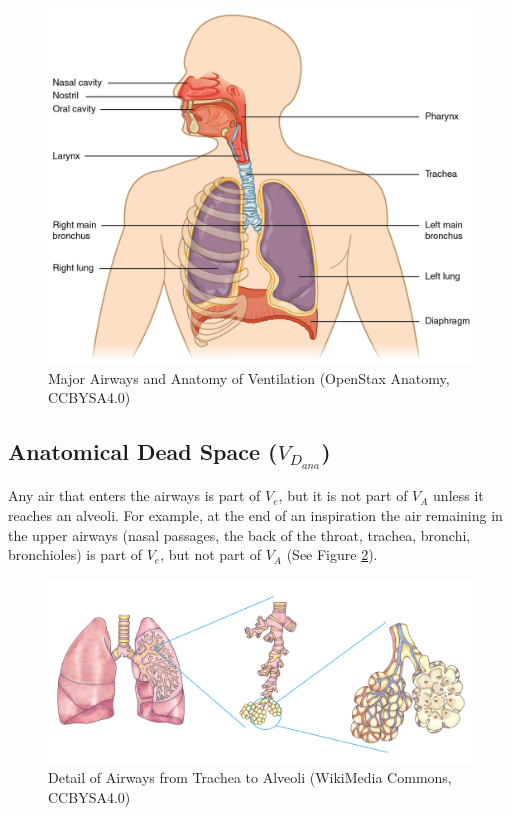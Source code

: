 \begin{figure}[!h]
    \centering
    \includegraphics[width=1.0 \linewidth]{./figure/ventilation/airways.jpg}
    \caption{Major Airways and Anatomy of Ventilation \footnotesize{(OpenStax Anatomy, CCBYSA4.0)}}
    \label{fig:airways}
\end{figure}

\subsection{Anatomical Dead Space ($V_D_{ana}$)}

Any air that enters the airways is part of $V_e$, but it is not part of $V_A$ unless it reaches an alveoli. For example, at the end of an inspiration the air remaining in the upper airways (nasal passages, the back of the throat, trachea, bronchi, bronchioles) is part of $V_e$, but not part of $V_A$ (See Figure \ref{fig:airways_detailed}). 

\begin{figure}[!h]
    \centering
    \includegraphics[width=1.0 \linewidth]{./figure/ventilation/airways_detailed.png}
    \caption{Detail of Airways from Trachea to Alveoli \footnotesize{(WikiMedia Commons, CCBYSA4.0)}}
    \label{fig:airways_detailed}
\end{figure}

